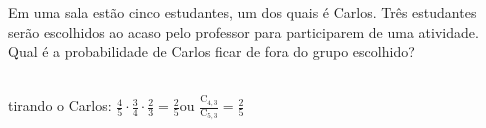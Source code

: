 \begin{ex}
 Em uma sala estão cinco estudantes, um dos quais é Carlos. Três estudantes serão escolhidos ao acaso pelo professor para participarem de uma atividade.	Qual é a probabilidade de Carlos ficar de fora do grupo escolhido?
   \begin{sol}
     \phantom{A} \\
     tirando o Carlos:
     $\frac{4}{5}\cdot\frac{3}{4}\cdot\frac{2}{3}=\frac{2}{5}$\hspace{0,2cm}ou\hspace{0,2cm}  
     $\frac{\mathrm{C}_{4,3}}{\mathrm{C}_{5,3}}=\frac{2}{5}$
   \end{sol}
\end{ex}